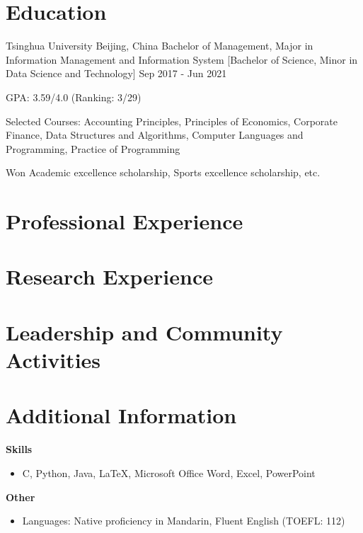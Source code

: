 \documentclass{resumeEN}
\begin{document}

\section{Education}

\Experience
{Tsinghua University}
{Beijing, China}
{Bachelor of Management, Major in Information Management and Information System}
[Bachelor of Science, Minor in Data Science and Technology]
{Sep 2017 - Jun 2021}{
    \item GPA: 3.59/4.0 (Ranking: 3/29)
    \item Selected Courses: Accounting Principles, Principles of Economics, Corporate Finance, Data Structures and Algorithms, Computer Languages and Programming, Practice of Programming
    \item Won Academic excellence scholarship, Sports excellence scholarship, etc.
}

\section{Professional Experience}

\summitview

\section{Research Experience}

\fifaresearch

\section{Leadership and Community Activities}

\cydp

\tkd

\semtech

\section{Additional Information}
\vspace{0.618ex}
\textbf{Skills}
\begin{itemize}
    \item C, Python, Java, {\LaTeX}, Microsoft Office Word, Excel, PowerPoint
\end{itemize}
\textbf{Other}
\begin{itemize}
    \item Languages: Native proficiency in Mandarin, Fluent English (TOEFL: 112)
\end{itemize}
\end{document}
